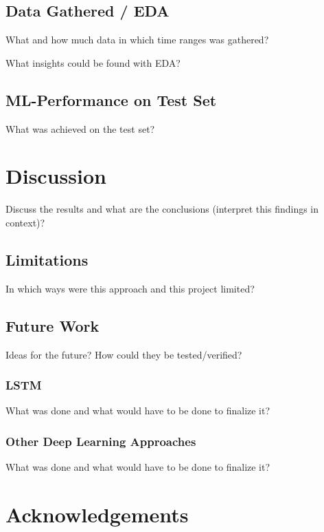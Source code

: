 \documentclass[pdflatex,sn-apa]{sn-jnl}
\begin{document}
\subsection{Data Gathered / EDA}

What and how much data in which time ranges was gathered?

What insights could be found with EDA?

\subsection{ML-Performance on Test Set}

What was achieved on the test set?

\section{Discussion}\label{discussion}

Discuss the results and what are the conclusions (interpret this findings in context)?

\subsection{Limitations}\label{limitation}

In which ways were this approach and this project limited?

\subsection{Future Work}\label{future_work}

Ideas for the future? How could they be tested/verified?

\subsubsection{LSTM}\label{lstm}

What was done and what would have to be done to finalize it?

\subsubsection{Other Deep Learning Approaches}\label{deep_learning}

What was done and what would have to be done to finalize it?

\backmatter

\section*{Acknowledgements}
\end{document}
